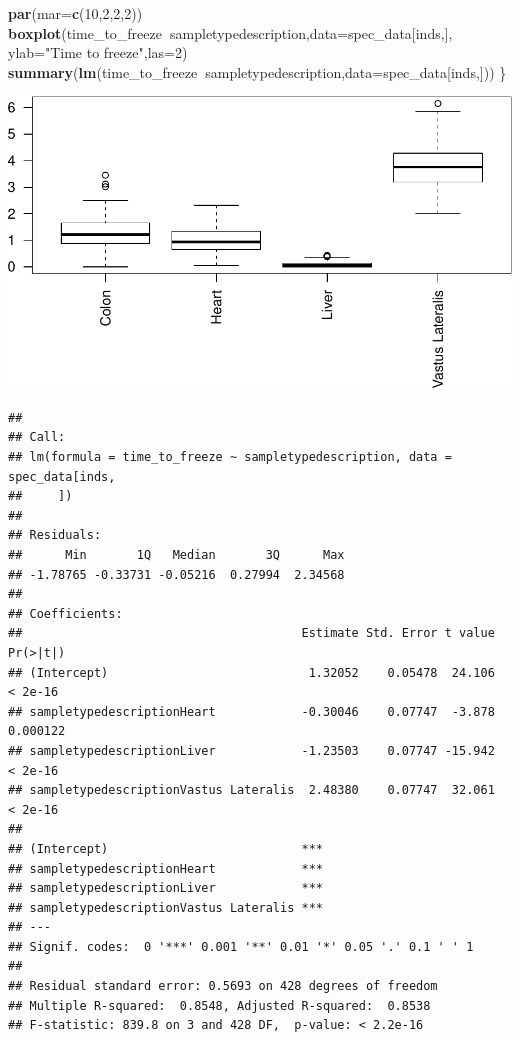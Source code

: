 \documentclass[]{article}
\newenvironment{Shaded}{\begin{snugshade}}{\end{snugshade}}
\newcommand{\KeywordTok}[1]{\textcolor[rgb]{0.13,0.29,0.53}{\textbf{#1}}}
\newcommand{\DataTypeTok}[1]{\textcolor[rgb]{0.13,0.29,0.53}{#1}}
\newcommand{\DecValTok}[1]{\textcolor[rgb]{0.00,0.00,0.81}{#1}}
\newcommand{\StringTok}[1]{\textcolor[rgb]{0.31,0.60,0.02}{#1}}
\newcommand{\OperatorTok}[1]{\textcolor[rgb]{0.81,0.36,0.00}{\textbf{#1}}}
\newcommand{\NormalTok}[1]{#1}
\begin{document}
\begin{Shaded}
\begin{Highlighting}[]
  \KeywordTok{par}\NormalTok{(}\DataTypeTok{mar=}\KeywordTok{c}\NormalTok{(}\DecValTok{10}\NormalTok{,}\DecValTok{2}\NormalTok{,}\DecValTok{2}\NormalTok{,}\DecValTok{2}\NormalTok{))}
  \KeywordTok{boxplot}\NormalTok{(time_to_freeze}\OperatorTok{~}\NormalTok{sampletypedescription,}\DataTypeTok{data=}\NormalTok{spec_data[inds,],}
        \DataTypeTok{ylab=}\StringTok{"Time to freeze"}\NormalTok{,}\DataTypeTok{las=}\DecValTok{2}\NormalTok{)  }
  \KeywordTok{summary}\NormalTok{(}\KeywordTok{lm}\NormalTok{(time_to_freeze}\OperatorTok{~}\NormalTok{sampletypedescription,}\DataTypeTok{data=}\NormalTok{spec_data[inds,]))}
\NormalTok{\}}
\end{Highlighting}
\end{Shaded}

\begin{center}\includegraphics[width=0.5\linewidth,height=0.5\textheight]{pheno_csv_files_analysis_files/figure-latex/unnamed-chunk-5-2} \end{center}

\begin{verbatim}
## 
## Call:
## lm(formula = time_to_freeze ~ sampletypedescription, data = spec_data[inds, 
##     ])
## 
## Residuals:
##      Min       1Q   Median       3Q      Max 
## -1.78765 -0.33731 -0.05216  0.27994  2.34568 
## 
## Coefficients:
##                                       Estimate Std. Error t value Pr(>|t|)
## (Intercept)                            1.32052    0.05478  24.106  < 2e-16
## sampletypedescriptionHeart            -0.30046    0.07747  -3.878 0.000122
## sampletypedescriptionLiver            -1.23503    0.07747 -15.942  < 2e-16
## sampletypedescriptionVastus Lateralis  2.48380    0.07747  32.061  < 2e-16
##                                          
## (Intercept)                           ***
## sampletypedescriptionHeart            ***
## sampletypedescriptionLiver            ***
## sampletypedescriptionVastus Lateralis ***
## ---
## Signif. codes:  0 '***' 0.001 '**' 0.01 '*' 0.05 '.' 0.1 ' ' 1
## 
## Residual standard error: 0.5693 on 428 degrees of freedom
## Multiple R-squared:  0.8548, Adjusted R-squared:  0.8538 
## F-statistic: 839.8 on 3 and 428 DF,  p-value: < 2.2e-16
\end{verbatim}
\end{document}
